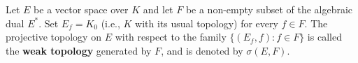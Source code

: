 Let $E$ be a vector space over $K$ and let $F$ be a non-empty subset of the algebraic dual $E^*$. Set $E_f = K_0$ (i.e., $K$ with its usual topology) for every $f \in F$. The projective topology on $E$ with respect to the family $\{(E_f, f): f \in F\}$ is called the \textbf{weak topology} generated by $F$, and is denoted by $\sigma(E, F)$.
